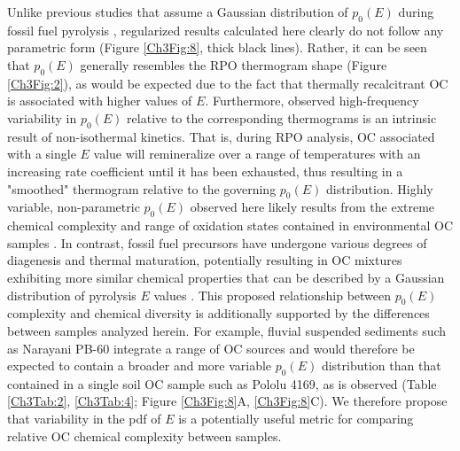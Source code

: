 Unlike previous studies that assume a Gaussian distribution of $p_{0}(E)$ during fossil fuel pyrolysis \citep{Lakshmanan:1994vs,Cai:2007hh,deCaprariis:2012jk}, regularized results calculated here clearly do not follow any parametric form (Figure \ref{Ch3Fig:8}, thick black lines). Rather, it can be seen that $p_{0}(E)$ generally resembles the RPO thermogram shape (Figure \ref{Ch3Fig:2}), as would be expected due to the fact that thermally recalcitrant OC is associated with higher values of $E$. Furthermore, observed high-frequency variability in $p_{0}(E)$ relative to the corresponding thermograms is an intrinsic result of non-isothermal kinetics. That is, during RPO analysis, OC associated with a single $E$ value will remineralize over a range of temperatures with an increasing rate coefficient until it has been exhausted, thus resulting in a "smoothed" thermogram relative to the governing $p_{0}(E)$ distribution. Highly variable, non-parametric $p_{0}(E)$ observed here likely results from the extreme chemical complexity and  range of oxidation states contained in environmental OC samples \citep[\textit{e.g.}][]{Kellerman:2015jn}. In contrast, fossil fuel precursors have undergone various degrees of diagenesis and thermal maturation, potentially resulting in OC mixtures exhibiting more similar chemical properties that can be described by a Gaussian distribution of pyrolysis $E$ values \citep{Braun:1987vf}. This proposed relationship between $p_{0}(E)$ complexity and chemical diversity is additionally supported by the differences between samples analyzed herein. For example, fluvial suspended sediments such as Narayani PB-60 integrate a range of OC sources \citep[\textit{e.g.} recently fixed biomass, pre-aged soils, and eroded rock-derived material;][]{Blair:2012du} and would therefore be expected to contain a broader and more variable $p_{0}(E)$ distribution than that contained in a single soil OC sample such as Pololu 4169, as is observed (Table \ref{Ch3Tab:2}, \ref{Ch3Tab:4}; Figure \ref{Ch3Fig:8}A, \ref{Ch3Fig:8}C). We therefore propose that variability in the pdf of $E$ is a potentially useful metric for comparing relative OC chemical complexity between samples.

